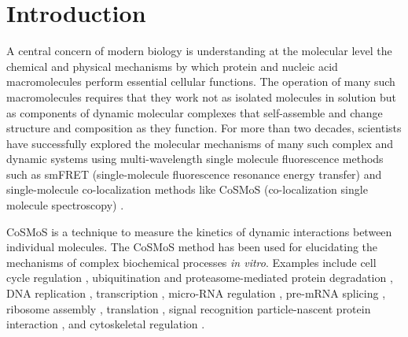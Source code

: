 \section*{Introduction}


A central concern of modern biology is understanding at the molecular level the chemical and physical mechanisms by which protein and nucleic acid macromolecules  perform essential cellular functions.  The operation of many such macromolecules requires that they work not as isolated molecules in solution but as components of dynamic molecular complexes that self-assemble and change structure and composition as they function.  For more than  two decades, scientists have successfully explored the molecular mechanisms of many such complex and dynamic systems using multi-wavelength single molecule fluorescence methods such as smFRET (single-molecule fluorescence resonance energy transfer) \cite{Roy2008-fo} and single-molecule co-localization methods like CoSMoS (co-localization single molecule spectroscopy) \cite{Larson2014-os, Van_Oijen2011-ig}.

CoSMoS is a technique to measure the kinetics of dynamic interactions between individual molecules.  The CoSMoS method has been used for elucidating the mechanisms of complex biochemical processes \textit{in vitro}. Examples include cell cycle regulation \cite{Lu2015-eu}, ubiquitination and proteasome-mediated protein degradation \cite{Lu2015-jq}, DNA replication \cite{Geertsema2014-bt,Ticau2015-ib}, transcription \cite{Zhang2012-no,Friedman2012-if,Friedman2013-sf}, micro-RNA regulation \cite{Salomon2015-kq}, pre-mRNA splicing \cite{Shcherbakova2013-bi, Krishnan2013-fy, Warnasooriya2014-ls}, ribosome assembly \cite{Kim2014-zc}, translation \cite{Wang2015-tt,Tsai2014-mi,OLeary2013-wo}, signal recognition particle-nascent protein interaction \cite{Noriega2014-vj}, and cytoskeletal regulation \cite{Smith2013-qj,Breitsprecher2012-mj}. 

